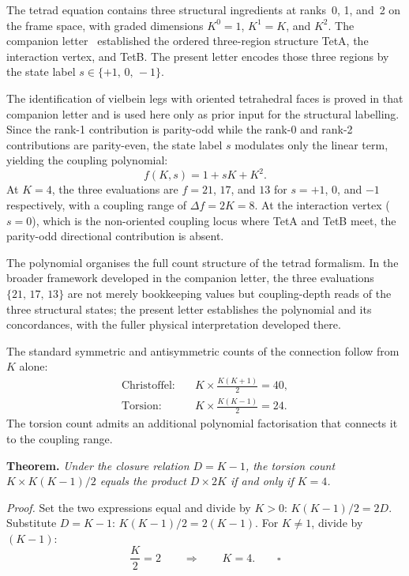 \documentclass[twocolumn]{iopjournal}
\begin{document}
The tetrad equation contains three structural ingredients at
ranks~0, 1, and~2 on the frame space, with graded dimensions
$K^0 = 1$, $K^1 = K$, and $K^2$. The companion
letter~\cite{Nelson2026a} established the ordered three-region
structure TetA, the interaction vertex, and TetB. The present
letter encodes those three regions by the state label
$s \in \{+1,\,0,\,-1\}$.

The identification of vielbein legs with oriented tetrahedral
faces is proved in that companion letter and is used here only
as prior input for the structural labelling. Since the rank-1
contribution is parity-odd while the rank-0 and rank-2
contributions are parity-even, the state label $s$ modulates
only the linear term, yielding the coupling polynomial:
\begin{equation}
  f(K, s) = 1 + sK + K^2.
  \label{eq:poly}
\end{equation}
At $K = 4$, the three evaluations are $f = 21$, $17$, and $13$
for $s = +1$, $0$, and $-1$ respectively, with a coupling range
of $\Delta f = 2K = 8$. At the interaction vertex ($s = 0$),
which is the non-oriented coupling locus where TetA and TetB
meet, the parity-odd directional contribution is absent.

The polynomial organises the full count structure of the tetrad
formalism. In the broader framework developed in the companion
letter, the three evaluations $\{21,\,17,\,13\}$ are not merely
bookkeeping values but coupling-depth reads of the three
structural states; the present letter establishes the polynomial
and its concordances, with the fuller physical interpretation
developed there.

The standard symmetric and antisymmetric counts of the
connection follow from $K$ alone:
\begin{align}
  \text{Christoffel:}\quad
    & K \times \frac{K(K{+}1)}{2} = 40,
    \label{eq:chris} \\[4pt]
  \text{Torsion:}\quad
    & K \times \frac{K(K{-}1)}{2} = 24.
    \label{eq:tors}
\end{align}
The torsion count admits an additional polynomial factorisation
that connects it to the coupling range.

\medskip
\noindent\textbf{Theorem.} \textit{Under the closure relation
$D = K - 1$, the torsion count
$K \times K(K{-}1)/2$ equals the product $D \times 2K$ if and
only if $K = 4$.}

\medskip\noindent\textit{Proof.}
Set the two expressions equal and divide by $K > 0$:
$K(K{-}1)/2 = 2D$. Substitute $D = K - 1$:
$K(K{-}1)/2 = 2(K{-}1)$. For $K \neq 1$, divide by $(K{-}1)$:
\begin{equation}
  \frac{K}{2} = 2 \qquad \Longrightarrow \qquad K = 4.
  \qquad\square
  \label{eq:thm}
\end{equation}
\end{document}
